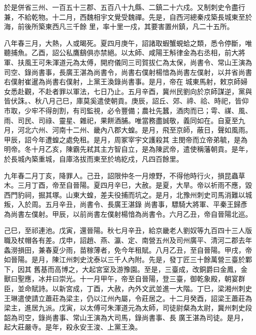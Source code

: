\begin{pinyinscope}
 於是併省三州、一百五十三郡、五百八十九縣、二鎮二十六戍。又制刺史令盡行兼，不給乾物。十二月，西魏相宇文覺受魏禪。先是，自西河總秦戍築長城東至於海，前後所築東西凡三千餘
 里，率十里一戍，其要害置州鎮，凡二十五所。



 八年春三月，大熱，人或暍死。夏四月庚午，詔諸取蝦蟹蜆蛤之類，悉令停斷，唯聽捕魚。乙酉，詔公私鷹鷂俱亦禁絕。以太師、咸陽王斛律金為右丞相，前大將軍、扶風王可朱渾道元為太傅，開府儀同三司賀拔仁為太保，尚書令、常山王演為司空、錄尚書事，長廣王湛為尚書令，尚書右僕射楊愔為尚書左僕射，以并省尚書右僕射崔暹為尚書右僕射，上黨王渙錄尚書事。是月，帝在
 城東馬射，敕京師婦女悉赴觀，不赴者罪以軍法，七日乃止。五月辛酉，冀州民劉向於京師謀逆，黨與皆伏誅。、秋八月己巳，庫莫奚遣使朝貢。庚辰，詔丘、郊、禘、祫、時祀，皆仰市取，少牢不得剖割，有司監視，必令豐備；農社先蠶，酒肉而已；雩、禖、風、雨、司民、司祿、靈星、雜祀，果餅酒脯。唯當務盡誠敬，義同如在。自夏至九月，河北六州、河南十二州、畿內八郡大蝗。是月，飛至京師，蔽日，聲如風雨。甲辰，詔今年遭蝗之處免租。是月，周冢宰宇文護殺其
 主閔帝而立帝弟毓，是為明帝。冬十月乙亥，陳霸先弒其主方智自立，是為陳武帝，遣使稱藩朝貢。是年，於長城內築重城，自庫洛拔而東至於塢紇戍，凡四百餘里。



 九年春二月丁亥，降罪人。己丑，詔限仲冬一月燎野，不得他時行火，損昆蟲草木。三月丁酉，帝至自晉陽。夏四月辛巳，大赦。是夏，大旱。帝以祈雨不應，毀西門豹祠，掘其塚。山東大蝗，差夫役捕而坑之。是月，北豫州刺史司馬消難以城叛，入於周。五月辛丑，尚書令、長廣王湛錄
 尚書事，驃騎大將軍、平秦王歸彥為尚書左僕射。甲辰，以前尚書左僕射楊愔為尚書令。六月乙丑，帝自晉陽北巡。



 己巳，至祁連池。戊寅，還晉陽。秋七月辛丑，給京畿老人劉奴等九百四十三人版職及杖帽各有差。戊申，詔趙、燕、瀛、定、南營五州及司州廣平、清河二郡去年螽澇損田，兼春夏少雨，苗稼薄者，免今年租賦。八月乙丑，至自晉陽。甲戌，帝如晉陽。是月，陳江州刺史沈泰以三千人內附。先是，發丁匠三十餘萬營三臺於鄴下，因其
 舊基而高博之，大起宮室及游豫園。至是，三臺成，改銅爵曰金鳳，金獸曰聖應，冰井曰崇光。十一月甲午，帝至自晉陽，登三臺，御乾象殿，朝宴群臣，並命賦詩。以新宮成，丁酉，大赦，內外文武並進一大階。丁巳，梁湘州刺史王琳遣使請立蕭莊為梁主，仍以江州內屬，令莊居之。十二月癸酉，詔梁王蕭莊為梁主，進居九派。戊寅，以太傅可朱渾道元為太師，司徒尉粲為太尉，冀州刺史段韶為司空，錄尚書事、常山王演為大司馬，錄尚書事、長
 廣王湛為司徒。是月，起大莊嚴寺。是年，殺永安王浚、上黨王渙。




\end{pinyinscope}
